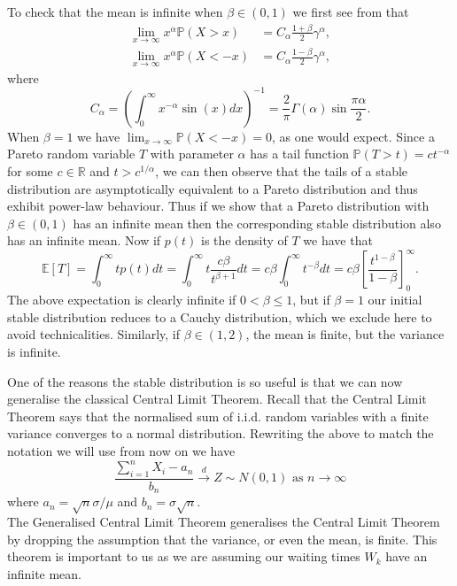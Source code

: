 \documentclass[honours,12pt]{unswthesis}
\newcommand{\R}{\mathbb{R}}
\newcommand{\PP}{\mathbb{P}}
\newcommand{\E}{\mathbb{E}}
\newcommand{\1}{\mathbf 1}
\numberwithin{equation}{section}
\theoremstyle{definition}
\theoremstyle{remark}
\begin{document}
\noindent To check that the mean is infinite when $\beta \in (0,1)$ we first see from \cite{JanickiWeron1994} that 
\begin{align}\label{eq:asymptoticPareto}
\lim_{x\to\infty} x^\alpha\PP(X>x)&=C_\alpha\frac{1+\beta}{2}\gamma^\alpha,\\
\lim_{x\to\infty} x^\alpha\PP(X<-x)&=C_\alpha\frac{1-\beta}{2}\gamma^\alpha,
\end{align}
\noindent where
\[
	C_\alpha=\left(\int^\infty_0 x^{-\alpha} \sin(x) dx  \right)^{-1}=\frac{2}{\pi}\Gamma(\alpha)\sin\frac{\pi\alpha}{2}.
\]
\noindent When $\beta=1$ we have $\lim_{x\to\infty}\PP(X<-x)=0$, as one would expect. Since a Pareto random variable $T$ with parameter $\alpha$ has a tail function $\PP(T>t)=ct^{-\alpha}$ for some $c\in \R$ and $t>c^{1/\alpha}$, we can then observe that the tails of a stable distribution are asymptotically equivalent to a Pareto distribution and thus exhibit power-law behaviour. 
Thus if we show that a Pareto distribution with $\beta \in (0,1)$ has an infinite mean then the corresponding stable distribution also has an infinite mean. Now if $p(t)$ is the density of $T$ we have that 
\[
	\E[T]=\int^\infty_0 tp(t)dt = \int^\infty_0 t\frac{c\beta}{t^{\beta+1}}dt = c\beta\int^\infty_0 t^{-\beta}dt = c\beta \left[\frac{t^{1-\beta}}{1-\beta}\right]^\infty_0.
\]
The above expectation is clearly infinite if $0<\beta\leq1$, but if $\beta=1$ our initial stable distribution reduces to a Cauchy distribution, which we exclude here to avoid technicalities.
Similarly, if $\beta \in (1,2)$, the mean is finite, but the variance is infinite.


One of the reasons the stable distribution is so useful is that we can now generalise the classical Central Limit Theorem. Recall that the Central Limit Theorem says that the normalised sum of i.i.d. random variables with a finite variance converges to a normal distribution. Rewriting the above to match the notation we will use from now on we have
\[
	\frac{\sum^n_{i=1}X_i-a_n}{b_n} \overset{d}{\to}Z \sim N(0,1) \textrm{ as $n\to\infty$}
\]
where $a_n=\sqrt{n}\sigma/\mu$ and $b_n=\sigma\sqrt{n}.$\\

\noindent The Generalised Central Limit Theorem generalises the Central Limit Theorem by dropping the assumption that the variance, or even the mean, is finite. This theorem is important to us as we are assuming our waiting times $W_k$ have an infinite mean.\\
\end{document}
